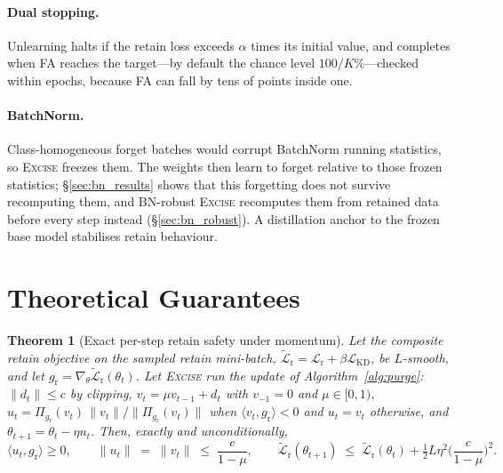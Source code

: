 \documentclass{article}
\newcommand{\ours}{\textsc{Excise}}
\newcommand{\gr}{g_{\mathrm{r}}}
\newcommand{\lossr}{\mathcal{L}_{\mathrm{r}}}
\newcommand{\losskd}{\mathcal{L}_{\mathrm{KD}}}
\newcommand{\Lrt}{\widetilde{\mathcal{L}}_{\mathrm{r}}}
\newcommand{\added}[1]{{\color{revised}#1}}
\newtheorem{theorem}{Theorem}
\theoremstyle{remark}
\theoremstyle{plain}
\begin{document}
\paragraph{Dual stopping.}\label{sec:stopping}
Unlearning halts if the retain loss exceeds $\alpha$ times its initial value,
and completes when FA reaches the target---by default the chance level
$100/K\%$---checked within epochs, because FA can fall by tens of points inside
one.

\paragraph{BatchNorm.}\label{sec:bn}
Class-homogeneous forget batches would corrupt BatchNorm running statistics, so
\ours{} freezes them. \added{The weights then learn to forget relative to those
frozen statistics; \S\ref{sec:bn_results} shows that this forgetting does not
survive recomputing them, and BN-robust \ours{} recomputes them from retained
data before every step instead (\S\ref{sec:bn_robust}).} A distillation anchor to
the frozen base model stabilises retain behaviour.

\section{Theoretical Guarantees}\label{sec:theory}

\begin{theorem}[Exact per-step retain safety under momentum]\label{thm:retain_safety}
Let the composite retain objective on the sampled retain mini-batch,
$\Lrt = \lossr + \beta\losskd$, be $L$-smooth, and let
$\gr = \nabla_\theta\Lrt(\theta_t)$. Let \ours{} run the update of
Algorithm~\ref{alg:purge}: $\|d_t\| \le c$ by clipping,
$v_t = \mu v_{t-1} + d_t$ with $v_{-1}=0$ and $\mu \in [0,1)$,
$u_t = \Pi_{\gr}(v_t)\,\|v_t\|/\|\Pi_{\gr}(v_t)\|$ when
$\langle v_t,\gr\rangle<0$ and $u_t = v_t$ otherwise, and
$\theta_{t+1} = \theta_t - \eta u_t$. Then, exactly and unconditionally,
\begin{equation}\label{eq:thm1}
\langle u_t,\gr\rangle \ge 0,
\qquad \|u_t\| \;=\; \|v_t\| \;\le\; \frac{c}{1-\mu},
\qquad \Lrt(\theta_{t+1}) \;\le\; \Lrt(\theta_t) + \tfrac{1}{2}L\eta^2\Big(\frac{c}{1-\mu}\Big)^{\!2}.
\end{equation}
\end{theorem}
\end{document}

